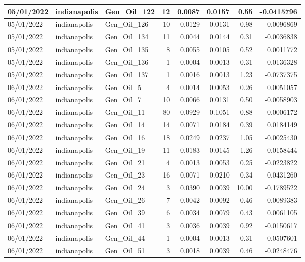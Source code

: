 \documentclass[
  letterpaper,
  DIV=11,
  numbers=noendperiod]{scrartcl}
\begin{document}
\begin{tabular}{l|l|l|r|r|r|r|r}
\hline
05/01/2022 & indianapolis & Gen\_Oil\_122 & 12 & 0.0087 & 0.0157 & 0.55 & -0.0415796\\
\hline
05/01/2022 & indianapolis & Gen\_Oil\_126 & 10 & 0.0129 & 0.0131 & 0.98 & -0.0096869\\
\hline
05/01/2022 & indianapolis & Gen\_Oil\_134 & 11 & 0.0044 & 0.0144 & 0.31 & -0.0036838\\
\hline
05/01/2022 & indianapolis & Gen\_Oil\_135 & 8 & 0.0055 & 0.0105 & 0.52 & 0.0011772\\
\hline
05/01/2022 & indianapolis & Gen\_Oil\_136 & 1 & 0.0004 & 0.0013 & 0.31 & -0.0136328\\
\hline
05/01/2022 & indianapolis & Gen\_Oil\_137 & 1 & 0.0016 & 0.0013 & 1.23 & -0.0737375\\
\hline
06/01/2022 & indianapolis & Gen\_Oil\_5 & 4 & 0.0014 & 0.0053 & 0.26 & 0.0051057\\
\hline
06/01/2022 & indianapolis & Gen\_Oil\_7 & 10 & 0.0066 & 0.0131 & 0.50 & -0.0058903\\
\hline
06/01/2022 & indianapolis & Gen\_Oil\_11 & 80 & 0.0929 & 0.1051 & 0.88 & -0.0006172\\
\hline
06/01/2022 & indianapolis & Gen\_Oil\_14 & 14 & 0.0071 & 0.0184 & 0.39 & 0.0184149\\
\hline
06/01/2022 & indianapolis & Gen\_Oil\_16 & 18 & 0.0249 & 0.0237 & 1.05 & -0.0025430\\
\hline
06/01/2022 & indianapolis & Gen\_Oil\_19 & 11 & 0.0183 & 0.0145 & 1.26 & -0.0158444\\
\hline
06/01/2022 & indianapolis & Gen\_Oil\_21 & 4 & 0.0013 & 0.0053 & 0.25 & -0.0223822\\
\hline
06/01/2022 & indianapolis & Gen\_Oil\_23 & 16 & 0.0071 & 0.0210 & 0.34 & -0.0431260\\
\hline
06/01/2022 & indianapolis & Gen\_Oil\_24 & 3 & 0.0390 & 0.0039 & 10.00 & -0.1789522\\
\hline
06/01/2022 & indianapolis & Gen\_Oil\_26 & 7 & 0.0042 & 0.0092 & 0.46 & -0.0089383\\
\hline
06/01/2022 & indianapolis & Gen\_Oil\_39 & 6 & 0.0034 & 0.0079 & 0.43 & 0.0061105\\
\hline
06/01/2022 & indianapolis & Gen\_Oil\_41 & 3 & 0.0036 & 0.0039 & 0.92 & -0.0150617\\
\hline
06/01/2022 & indianapolis & Gen\_Oil\_44 & 1 & 0.0004 & 0.0013 & 0.31 & -0.0507601\\
\hline
06/01/2022 & indianapolis & Gen\_Oil\_51 & 3 & 0.0018 & 0.0039 & 0.46 & -0.0248476\\

\end{tabular}
\end{document}

